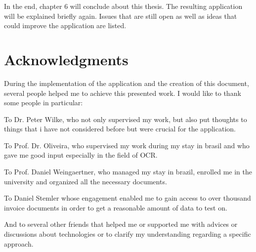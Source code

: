 In the end, chapter 6 will conclude about this thesis. The resulting application will be explained briefly again. Issues that are still open as well as ideas that could improve the application are listed.

\section{Acknowledgments}

During the implementation of the application and the creation of this document, several people helped me to achieve this presented work. I would like to thank some people in particular:

To Dr. Peter Wilke, who not only supervised my work, but also put thoughts to things that i have not considered before but were crucial for the application.

To Prof. Dr. Oliveira, who supervised my work during my stay in brasil and who gave me good input especially in the field of OCR.

To Prof. Daniel Weingaertner, who managed my stay in brazil, enrolled me in the university and organized all the necessary documents.

To Daniel Stemler whose engagement enabled me to gain access to over thousand invoice documents in order to get a reasonable amount of data to test on.

And to several other friends that helped me or supported me with advices or discussions about technologies or to clarify my understanding regarding a specific approach.